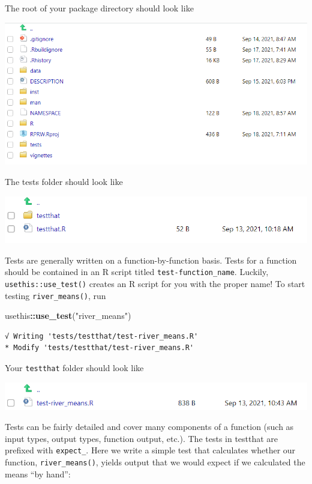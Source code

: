 \documentclass[
]{book}
\newenvironment{Shaded}{\begin{snugshade}}{\end{snugshade}}
\newcommand{\KeywordTok}[1]{\textcolor[rgb]{0.13,0.29,0.53}{\textbf{#1}}}
\newcommand{\NormalTok}[1]{#1}
\newcommand{\OperatorTok}[1]{\textcolor[rgb]{0.81,0.36,0.00}{\textbf{#1}}}
\newcommand{\StringTok}[1]{\textcolor[rgb]{0.31,0.60,0.02}{#1}}
\begin{document}
The root of your package directory should look like

\includegraphics[width=1\linewidth]{images/newrpack_files3}

The tests folder should look like

\includegraphics[width=1\linewidth]{images/newrpack_files4}

Tests are generally written on a function-by-function basis. Tests for a function should be contained in an R script titled \texttt{test-function\_name}. Luckily, \texttt{usethis::use\_test()} creates an R script for you with the proper name! To start testing \texttt{river\_means()}, run

\begin{Shaded}
\begin{Highlighting}[]
\NormalTok{usethis}\OperatorTok{::}\KeywordTok{use_test}\NormalTok{(}\StringTok{"river_means"}\NormalTok{)}
\end{Highlighting}
\end{Shaded}

\begin{verbatim}
√ Writing 'tests/testthat/test-river_means.R'
* Modify 'tests/testthat/test-river_means.R'
\end{verbatim}

Your \texttt{testthat} folder should look like

\includegraphics[width=1\linewidth]{images/newrpack_files5}

Tests can be fairly detailed and cover many components of a function (such as input types, output types, function output, etc.). The tests in testthat are prefixed with \texttt{expect\_}. Here we write a simple test that calculates whether our function, \texttt{river\_means()}, yields output that we would expect if we calculated the means ``by hand'':
\end{document}
